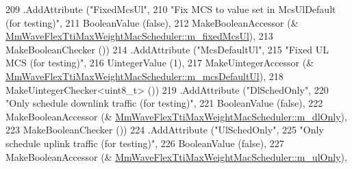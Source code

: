 \begin{DoxyCode}
209          .AddAttribute (\textcolor{stringliteral}{"FixedMcsUl"},
210                                                                         \textcolor{stringliteral}{"Fix MCS to value set in
       McsUlDefault (for testing)"},
211                                                                         BooleanValue (\textcolor{keyword}{false}),
212                                                                         MakeBooleanAccessor (&
      \hyperlink{classns3_1_1MmWaveFlexTtiMaxWeightMacScheduler_a81c87e383d372309a5ccde6588636bba}{MmWaveFlexTtiMaxWeightMacScheduler::m\_fixedMcsUl}),
213                                                                         MakeBooleanChecker ())
214         .AddAttribute (\textcolor{stringliteral}{"McsDefaultUl"},
215                                                                  \textcolor{stringliteral}{"Fixed UL MCS (for testing)"},
216                                                                  UintegerValue (1),
217                                                                  MakeUintegerAccessor (&
      \hyperlink{classns3_1_1MmWaveFlexTtiMaxWeightMacScheduler_a2b31e4f4780db286026e2e8a74f468b2}{MmWaveFlexTtiMaxWeightMacScheduler::m\_mcsDefaultUl}),
218                                                                  MakeUintegerChecker<uint8\_t> ())
219          .AddAttribute (\textcolor{stringliteral}{"DlSchedOnly"},
220                                                                         \textcolor{stringliteral}{"Only schedule downlink traffic
       (for testing)"},
221                                                                         BooleanValue (\textcolor{keyword}{false}),
222                                                                         MakeBooleanAccessor (&
      \hyperlink{classns3_1_1MmWaveFlexTtiMaxWeightMacScheduler_a1109bf69ff2902c2bb80904ae7b61aae}{MmWaveFlexTtiMaxWeightMacScheduler::m\_dlOnly}),
223                                                                         MakeBooleanChecker ())
224          .AddAttribute (\textcolor{stringliteral}{"UlSchedOnly"},
225                                                                         \textcolor{stringliteral}{"Only schedule uplink traffic (for
       testing)"},
226                                                                         BooleanValue (\textcolor{keyword}{false}),
227                                                                         MakeBooleanAccessor (&
      \hyperlink{classns3_1_1MmWaveFlexTtiMaxWeightMacScheduler_ad789c10291d375b6d022aed236b8134e}{MmWaveFlexTtiMaxWeightMacScheduler::m\_ulOnly}),

\end{DoxyCode}
